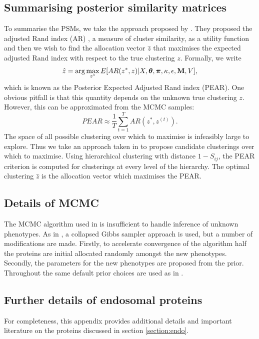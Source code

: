 \documentclass[12pt,english]{article}
\begin{document}
\subsection{Summarising posterior similarity matrices}
To summarise the PSMs, we take the approach proposed by \cite{fritsch::2009}. They proposed the adjusted Rand index (AR) \citep{rand::1971, Hubert::1985}, a measure of cluster similarity, as a utility function and then we wish to find the allocation vector $\hat{z}$ that maximises the expected adjusted Rand index with respect to the true clustering $z$. Formally, we write
\begin{equation}
\hat{z} = \arg \max_{z^*} E[AR(z^*, z)|X, \boldsymbol{\theta}, \boldsymbol{\pi} , \kappa, \epsilon, {\bf M}, V],
\end{equation}
which is known as the Posterior Expected Adjusted Rand index (PEAR). One obvious pitfall is that this quantity depends on the unknown true clustering $z$. However, this can be approximated from the MCMC samples:
\begin{equation}
PEAR \approx \frac{1}{T} \sum_{t = 1}^{T}AR(z^*, z^{(t)}).
\end{equation}
The space of all possible clustering over which to maximise is infeasibly large to explore. Thus we take an approach taken in \cite{fritsch::2009} to propose candidate clusterings over which to maximise. Using hierarchical clustering with distance $1 - S_{ij}$, the PEAR criterion is computed for clusterings at every level of the hierarchy. The optimal clustering $\hat{z}$ is the allocation vector which maximises the PEAR.
\subsection{Details of MCMC}
The MCMC algorithm used in \cite{Crook:2018} is insufficient to handle inference of unknown phenotypes. As in \cite{Crook:2018}, a collapsed Gibbs sampler approach is used, but a number of modifications are made. Firstly, to accelerate convergence of the algorithm half the proteins are initial allocated randomly amongst the new phenotypes. Secondly, the parameters for the new phenotypes are proposed from the prior. Throughout the same default prior choices are used as in \cite{Crook:2018}.

\subsection{Further details of endosomal proteins}
For completeness, this appendix provides additional details and important literature on the proteins discussed in section \ref{section:endo}.
\end{document}
